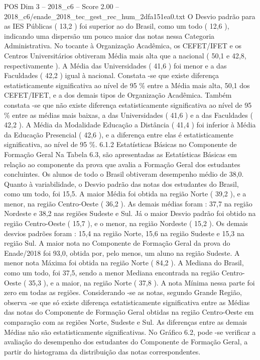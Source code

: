 \begin{textsample}{POS Dim 3 – 2018\_c6 – Score 2.00 – 2018\_c6/enade\_2018\_tec\_gest\_rec\_hum\_2dfa151ea0.txt}
O Desvio padrão para as IES Públicas ( 13,2 ) foi superior ao do Brasil, como um todo ( 12,6 ), indicando uma dispersão um pouco maior das notas nessa Categoria Administrativa.
No tocante à Organização Acadêmica, os CEFET/IFET e os Centros Universitários obtiveram Média mais alta que a nacional ( 50,1 e 42,8, respectivamente ).
A Média das Universidades ( 41,6 ) foi menor e a das Faculdades ( 42,2 ) igual à nacional.
Constata -se que existe diferença estatisticamente significativa ao nível de 95 \% entre a Média mais alta, 50,1 dos CEFET/IFET, e a dos demais tipos de Organização Acadêmica.
Também constata -se que não existe diferença estatisticamente significativa ao nível de 95 \% entre as médias mais baixas, a das Universidades ( 41,6 ) e a das Faculdades ( 42,2 ).
A Média da Modalidade Educação a Distância ( 41,4 ) foi inferior à Média da Educação Presencial ( 42,6 ), e a diferença entre elas é estatisticamente significativa, ao nível de 95 \%. 6.1.2 Estatísticas Básicas no Componente de Formação Geral Na Tabela 6.3, são apresentadas as Estatísticas Básicas em relação ao componente da prova que avalia a Formação Geral dos estudantes concluintes.
Os alunos de todo o Brasil obtiveram desempenho médio de 38,0.
Quanto à variabilidade, o Desvio padrão das notas dos estudantes do Brasil, como um todo, foi 15,5.
A maior Média foi obtida na região Norte ( 39,2 ), e a menor, na região Centro-Oeste ( 36,2 ).
As demais médias foram : 37,7 na região Nordeste e 38,2 nas regiões Sudeste e Sul.
Já o maior Desvio padrão foi obtido na região Centro-Oeste ( 15,7 ), e o menor, na região Nordeste ( 15,2 ).
Os demais desvios padrões foram : 15,4 na região Norte, 15,6 na região Sudeste e 15,3 na região Sul.
A maior nota no Componente de Formação Geral da prova do Enade/2018 foi 93,0, obtida por, pelo menos, um aluno na região Sudeste.
A menor nota Máxima foi obtida na região Norte ( 84,2 ).
A Mediana do Brasil, como um todo, foi 37,5, sendo a menor Mediana encontrada na região Centro-Oeste ( 35,3 ), e a maior, na região Norte ( 37,8 ).
A nota Mínima nessa parte foi zero em todas as regiões.
Considerando -se as notas, segundo Grande Região, observa -se que só existe diferença estatisticamente significativa entre as Médias das notas do Componente de Formação Geral obtidas na região Centro-Oeste em comparação com as regiões Norte, Sudeste e Sul.
As diferenças entre as demais Médias não são estatisticamente significativas.
No Gráfico 6.2, pode -se verificar a avaliação do desempenho dos estudantes do Componente de Formação Geral, a partir do histograma da distribuição das notas correspondentes.

\end{textsample}
